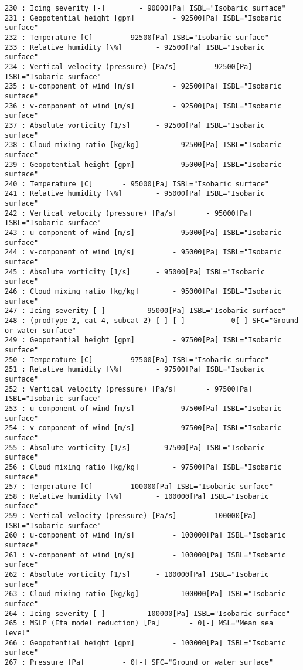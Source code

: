 \documentclass[11pt]{article}
\begin{document}
\begin{Verbatim}[commandchars=\\\{\}]
230 : Icing severity [-] 		- 90000[Pa] ISBL="Isobaric surface"
231 : Geopotential height [gpm] 		- 92500[Pa] ISBL="Isobaric surface"
232 : Temperature [C] 		- 92500[Pa] ISBL="Isobaric surface"
233 : Relative humidity [\%] 		- 92500[Pa] ISBL="Isobaric surface"
234 : Vertical velocity (pressure) [Pa/s] 		- 92500[Pa] ISBL="Isobaric surface"
235 : u-component of wind [m/s] 		- 92500[Pa] ISBL="Isobaric surface"
236 : v-component of wind [m/s] 		- 92500[Pa] ISBL="Isobaric surface"
237 : Absolute vorticity [1/s] 		- 92500[Pa] ISBL="Isobaric surface"
238 : Cloud mixing ratio [kg/kg] 		- 92500[Pa] ISBL="Isobaric surface"
239 : Geopotential height [gpm] 		- 95000[Pa] ISBL="Isobaric surface"
240 : Temperature [C] 		- 95000[Pa] ISBL="Isobaric surface"
241 : Relative humidity [\%] 		- 95000[Pa] ISBL="Isobaric surface"
242 : Vertical velocity (pressure) [Pa/s] 		- 95000[Pa] ISBL="Isobaric surface"
243 : u-component of wind [m/s] 		- 95000[Pa] ISBL="Isobaric surface"
244 : v-component of wind [m/s] 		- 95000[Pa] ISBL="Isobaric surface"
245 : Absolute vorticity [1/s] 		- 95000[Pa] ISBL="Isobaric surface"
246 : Cloud mixing ratio [kg/kg] 		- 95000[Pa] ISBL="Isobaric surface"
247 : Icing severity [-] 		- 95000[Pa] ISBL="Isobaric surface"
248 : (prodType 2, cat 4, subcat 2) [-] [-] 		- 0[-] SFC="Ground or water surface"
249 : Geopotential height [gpm] 		- 97500[Pa] ISBL="Isobaric surface"
250 : Temperature [C] 		- 97500[Pa] ISBL="Isobaric surface"
251 : Relative humidity [\%] 		- 97500[Pa] ISBL="Isobaric surface"
252 : Vertical velocity (pressure) [Pa/s] 		- 97500[Pa] ISBL="Isobaric surface"
253 : u-component of wind [m/s] 		- 97500[Pa] ISBL="Isobaric surface"
254 : v-component of wind [m/s] 		- 97500[Pa] ISBL="Isobaric surface"
255 : Absolute vorticity [1/s] 		- 97500[Pa] ISBL="Isobaric surface"
256 : Cloud mixing ratio [kg/kg] 		- 97500[Pa] ISBL="Isobaric surface"
257 : Temperature [C] 		- 100000[Pa] ISBL="Isobaric surface"
258 : Relative humidity [\%] 		- 100000[Pa] ISBL="Isobaric surface"
259 : Vertical velocity (pressure) [Pa/s] 		- 100000[Pa] ISBL="Isobaric surface"
260 : u-component of wind [m/s] 		- 100000[Pa] ISBL="Isobaric surface"
261 : v-component of wind [m/s] 		- 100000[Pa] ISBL="Isobaric surface"
262 : Absolute vorticity [1/s] 		- 100000[Pa] ISBL="Isobaric surface"
263 : Cloud mixing ratio [kg/kg] 		- 100000[Pa] ISBL="Isobaric surface"
264 : Icing severity [-] 		- 100000[Pa] ISBL="Isobaric surface"
265 : MSLP (Eta model reduction) [Pa] 		- 0[-] MSL="Mean sea level"
266 : Geopotential height [gpm] 		- 100000[Pa] ISBL="Isobaric surface"
267 : Pressure [Pa] 		- 0[-] SFC="Ground or water surface"

\end{Verbatim}
\end{document}
